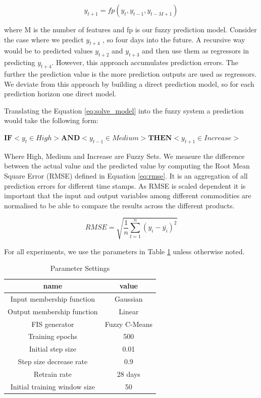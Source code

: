\begin{equation} \label{eq:solve_model}
y_{t + 1} = fp(y_{t}, y_{t-1}, y_{t-M+1})
 \end{equation}

where M is the number of features and fp is our fuzzy prediction model. Consider the case where we predict $y_{t +4}$ , so four days into the future. A recursive way would be to predicted values $y_{t+2}$ and $y_{t+3}$ and then use them as regressors in predicting $y_{t +4}$. However, this approach accumulates prediction errors. The further the prediction value is the more prediction outputs are used as regressors. We deviate from this approach by building a direct prediction model, so for each prediction horizon one direct model. 

Translating the Equation \ref{eq:solve_model} into the fuzzy system a prediction would take the following form: \\

\centerline {$ \textbf{IF} <  y_t  \in High> \textbf{AND} < y_{t-1} \in Medium > \textbf{THEN} <  y_{t+1} \in Increase > $} 


Where High, Medium and Increase are Fuzzy Sets. We measure the difference between the actual value and the predicted value by computing the Root Mean Square Error (RMSE) defined in Equation \ref{eq:rmse}. It is an aggregation of all prediction errors for different time stamps. As RMSE is scaled dependent it is important that the input and output variables among different commodities are normalised to be able to compare the results across the different products. 


\begin{equation} \label{eq:rmse}
RMSE = \sqrt{\frac{1}{n}\sum_{t=1}^{n} (y_i -  \overline{y_i})^2}
 \end{equation}



For all experiments, we use the parameters in Table \ref{tab:abcde} unless otherwise noted.



\begin{table}[H]
\centering
\begin{tabular}{ |c|c| } 

 name & value \\ 
  \hline
 Input membership function & Gaussian \\ 
 Output membership function & Linear \\ 
 FIS generator& Fuzzy C-Means \\ 
 Training epochs & 500 \\ 
 Initial step size & 0.01 \\ 
 Step size decrease rate & 0.9\\ 
 Retrain rate & 28 days \\ 
 Initial training window size & 50 \\ 

\end{tabular}
\caption{Parameter Settings}
\label{tab:abcde}
\end{table}


